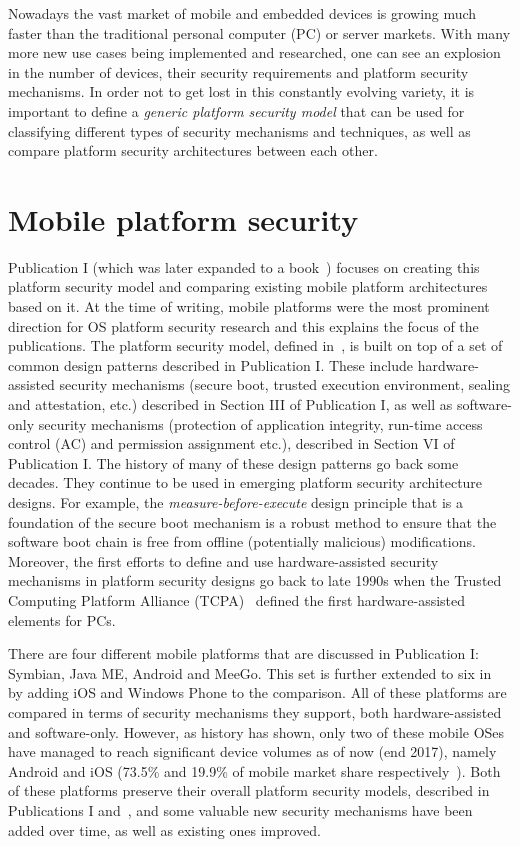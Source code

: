 
Nowadays the vast market of mobile and embedded devices is growing much faster than the traditional personal computer (PC) or server markets. With many more new use cases being implemented and researched, one can see an explosion in the number of devices, their security requirements and platform security mechanisms. In order not to get lost in this constantly evolving variety, it is important to define a \textit{generic platform security model} that can be used for classifying different types of security mechanisms and techniques, as well as compare platform security architectures between each other. 

\section{Mobile platform security}

Publication I (which was later expanded to a book~\cite{2013Asokan}) focuses on creating this platform security model and comparing existing mobile platform architectures based on it. At the time of writing, mobile platforms were the most prominent direction for OS platform security research and this explains the focus of the publications. The platform security model, defined in~\cite{2013Asokan}, is built on top of a set of common design patterns described in Publication I. These include hardware-assisted security mechanisms (secure boot, trusted execution environment, sealing and attestation, etc.) described in Section III of Publication I, as well as software-only security mechanisms (protection of application integrity, run-time access control (AC) and permission assignment etc.), described in Section VI of Publication I. The history of many of these design patterns go back some decades. They continue to be used in emerging platform security architecture designs. For example, the \textit{measure-before-execute} design principle that is a foundation of the secure boot mechanism is a robust method to ensure that the software boot chain is free from offline (potentially malicious) modifications. Moreover, the first efforts to define and use hardware-assisted security mechanisms in platform security designs go back to late 1990s when the Trusted Computing Platform Alliance (TCPA)~\cite{pearson2002} defined the first hardware-assisted elements for PCs.

There are four different mobile platforms that are discussed in Publication I: Symbian, Java ME, Android and MeeGo. This set is further extended to six in~\cite{2013Asokan} by adding iOS and Windows Phone to the comparison. All of these platforms are compared in terms of security mechanisms they support, both hardware-assisted and software-only. However, as history has shown, only two of these mobile OSes have managed to reach significant device volumes as of now (end 2017), namely Android and iOS (73.5\% and 19.9\% of mobile market share respectively~\cite{osshare}). Both of these platforms preserve their overall platform security models, described in Publications I and~\cite{2013Asokan}, and some valuable new security mechanisms have been added over time, as well as existing ones improved. 

